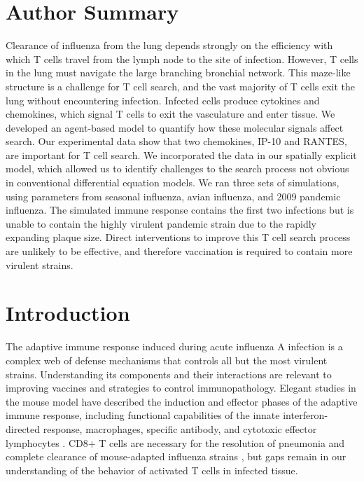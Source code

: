 \documentclass[10pt]{article}
\begin{document}
\section*{Author Summary}

Clearance of influenza from the lung depends strongly on the efficiency with which T cells travel from the lymph node to the site of infection.  However, T cells in the lung must navigate the large branching bronchial network.  This maze-like structure is a challenge for T cell search, and the vast majority of T cells exit the lung without encountering infection.  Infected cells produce cytokines and chemokines, which signal T cells to exit the vasculature and enter tissue.  We developed an agent-based model to quantify how these molecular signals affect search.  Our experimental data show that two chemokines, IP-10 and RANTES, are important for T cell search.  We incorporated the data in our spatially explicit model, which allowed us to identify challenges to the search process not obvious in conventional differential equation models.  We ran three sets of simulations, using parameters from seasonal influenza, avian influenza, and 2009 pandemic influenza.  The simulated immune response contains the first two infections but is unable to contain the highly virulent pandemic strain due to the rapidly expanding plaque size.  Direct interventions to improve this T cell search process are unlikely to be effective, and therefore vaccination is required to contain more virulent strains.

\section*{Introduction}

The adaptive immune response induced during acute influenza A infection is a complex web of defense mechanisms that controls all but the most virulent strains.  Understanding its components and their interactions are relevant to improving vaccines and strategies to control immunopathology. Elegant studies in the mouse model have described the induction and effector phases of the adaptive immune response, including functional capabilities of the innate interferon-directed response, macrophages, specific antibody, and cytotoxic effector lymphocytes \cite{Sallusto2000, Joo2008, Mackay2008}.   CD8+ T cells are necessary for the resolution of pneumonia and complete clearance of mouse-adapted influenza strains \cite{Sallusto2000, Joo2008, Mackay2008, Miao2010}, but gaps remain in our understanding of the behavior of activated T cells in infected tissue.
\end{document}
